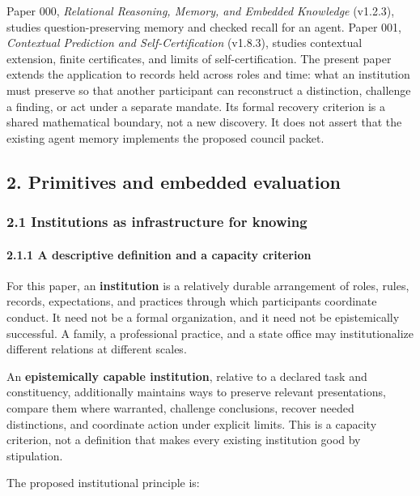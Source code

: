 \documentclass[
  10pt,
]{article}
\begin{document}
Paper 000, \emph{Relational Reasoning, Memory, and Embedded Knowledge} (v1.2.3), studies question-preserving memory and checked recall for an agent. Paper 001, \emph{Contextual Prediction and Self-Certification} (v1.8.3), studies contextual extension, finite certificates, and limits of self-certification. The present paper extends the application to records held across roles and time: what an institution must preserve so that another participant can reconstruct a distinction, challenge a finding, or act under a separate mandate. Its formal recovery criterion is a shared mathematical boundary, not a new discovery. It does not assert that the existing agent memory implements the proposed council packet.

\subsection{2. Primitives and embedded evaluation}\label{primitives-and-embedded-evaluation}

\subsubsection{2.1 Institutions as infrastructure for knowing}\label{institutions-as-infrastructure-for-knowing}

\paragraph{2.1.1 A descriptive definition and a capacity criterion}\label{a-descriptive-definition-and-a-capacity-criterion}

For this paper, an \textbf{institution} is a relatively durable arrangement of roles, rules, records, expectations, and practices through which participants coordinate conduct. It need not be a formal organization, and it need not be epistemically successful. A family, a professional practice, and a state office may institutionalize different relations at different scales.

An \textbf{epistemically capable institution}, relative to a declared task and constituency, additionally maintains ways to preserve relevant presentations, compare them where warranted, challenge conclusions, recover needed distinctions, and coordinate action under explicit limits. This is a capacity criterion, not a definition that makes every existing institution good by stipulation.

The proposed institutional principle is:
\end{document}
